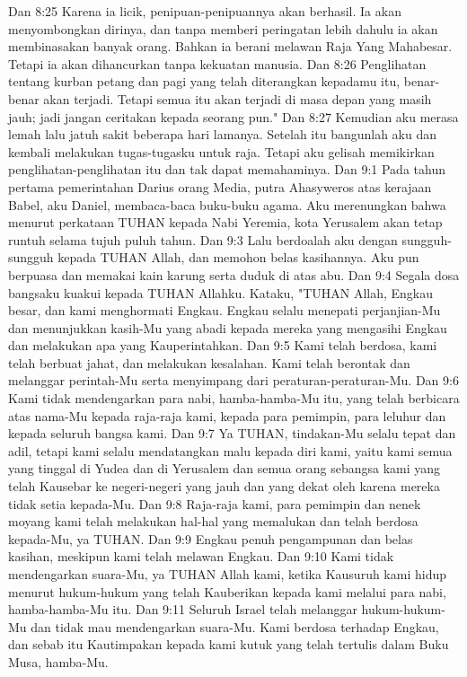 Dan 8:25  Karena ia licik, penipuan-penipuannya akan berhasil. Ia akan menyombongkan dirinya, dan tanpa memberi peringatan lebih dahulu ia akan membinasakan banyak orang. Bahkan ia berani melawan Raja Yang Mahabesar. Tetapi ia akan dihancurkan tanpa kekuatan manusia.
Dan 8:26  Penglihatan tentang kurban petang dan pagi yang telah diterangkan kepadamu itu, benar-benar akan terjadi. Tetapi semua itu akan terjadi di masa depan yang masih jauh; jadi jangan ceritakan kepada seorang pun."
Dan 8:27  Kemudian aku merasa lemah lalu jatuh sakit beberapa hari lamanya. Setelah itu bangunlah aku dan kembali melakukan tugas-tugasku untuk raja. Tetapi aku gelisah memikirkan penglihatan-penglihatan itu dan tak dapat memahaminya.
Dan 9:1  Pada tahun pertama pemerintahan Darius orang Media, putra Ahasyweros atas kerajaan Babel, aku Daniel, membaca-baca buku-buku agama. Aku merenungkan bahwa menurut perkataan TUHAN kepada Nabi Yeremia, kota Yerusalem akan tetap runtuh selama tujuh puluh tahun.
Dan 9:3  Lalu berdoalah aku dengan sungguh-sungguh kepada TUHAN Allah, dan memohon belas kasihannya. Aku pun berpuasa dan memakai kain karung serta duduk di atas abu.
Dan 9:4  Segala dosa bangsaku kuakui kepada TUHAN Allahku. Kataku, "TUHAN Allah, Engkau besar, dan kami menghormati Engkau. Engkau selalu menepati perjanjian-Mu dan menunjukkan kasih-Mu yang abadi kepada mereka yang mengasihi Engkau dan melakukan apa yang Kauperintahkan.
Dan 9:5  Kami telah berdosa, kami telah berbuat jahat, dan melakukan kesalahan. Kami telah berontak dan melanggar perintah-Mu serta menyimpang dari peraturan-peraturan-Mu.
Dan 9:6  Kami tidak mendengarkan para nabi, hamba-hamba-Mu itu, yang telah berbicara atas nama-Mu kepada raja-raja kami, kepada para pemimpin, para leluhur dan kepada seluruh bangsa kami.
Dan 9:7  Ya TUHAN, tindakan-Mu selalu tepat dan adil, tetapi kami selalu mendatangkan malu kepada diri kami, yaitu kami semua yang tinggal di Yudea dan di Yerusalem dan semua orang sebangsa kami yang telah Kausebar ke negeri-negeri yang jauh dan yang dekat oleh karena mereka tidak setia kepada-Mu.
Dan 9:8  Raja-raja kami, para pemimpin dan nenek moyang kami telah melakukan hal-hal yang memalukan dan telah berdosa kepada-Mu, ya TUHAN.
Dan 9:9  Engkau penuh pengampunan dan belas kasihan, meskipun kami telah melawan Engkau.
Dan 9:10  Kami tidak mendengarkan suara-Mu, ya TUHAN Allah kami, ketika Kausuruh kami hidup menurut hukum-hukum yang telah Kauberikan kepada kami melalui para nabi, hamba-hamba-Mu itu.
Dan 9:11  Seluruh Israel telah melanggar hukum-hukum-Mu dan tidak mau mendengarkan suara-Mu. Kami berdosa terhadap Engkau, dan sebab itu Kautimpakan kepada kami kutuk yang telah tertulis dalam Buku Musa, hamba-Mu.
